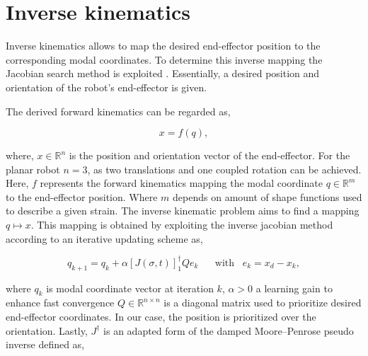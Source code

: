 \section{Inverse kinematics}
\label{app:chap2}



Inverse kinematics allows to map the desired end-effector position to the corresponding modal coordinates. To determine this inverse mapping the Jacobian search method is exploited \cite{JacobianInverse}. Essentially, a desired position and orientation of the robot's end-effector is given. 


The derived forward kinematics can be regarded as,

\begin{equation}
    x = f(q),
\end{equation}

where, $x \in \mathbb{R}^n$ is the position and orientation vector of the end-effector. For the planar robot $n = 3$, as two translations and one coupled rotation can be achieved. Here, $f$ represents the forward kinematics mapping the modal coordinate $q \in \mathbb{R}^m$ to the end-effector position. Where $m$ depends on amount of shape functions used to describe a given strain. The inverse kinematic problem aims to find a mapping $q\mapsto x$. This mapping is obtained by exploiting the inverse jacobian method according to an iterative updating scheme as,

\begin{equation}
    q_{k+1} = q_k + \alpha [J(\sigma,t)]_1^\dagger Q e_k \hspace{20pt} \text{with} \hspace{10pt}  e_k = x_d - x_k,
    \label{eq2:qupdate}
\end{equation}

where $q_k$ is modal coordinate vector at iteration $k$, $\alpha > 0$ a learning gain to enhance fast convergence $Q \in \mathbb{R}^{n\times n}$ is a diagonal matrix used to prioritize desired end-effector coordinates. In our case, the position is prioritized over the orientation. Lastly, $J^\dagger$ is an adapted form of the damped Moore–Penrose pseudo inverse defined as,

